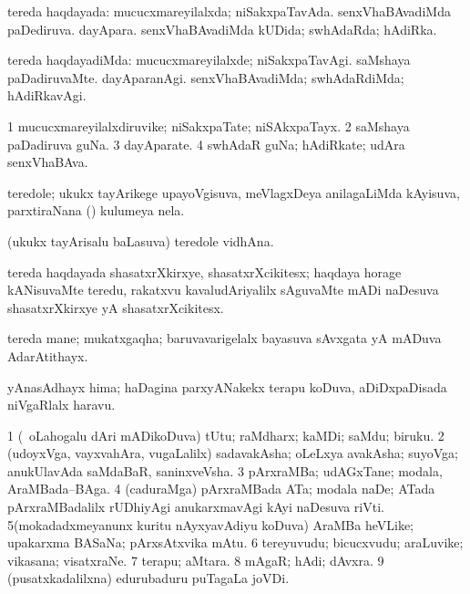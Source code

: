 \bentry
{}
\gl{\gu}
\bmng
tereda haqdayada: 
\banum
{} mucucxmareyilalxda; niSakxpaTavAda. 
 senxVhaBAvadiMda paDediruva. 
 dayApara. 
 senxVhaBAvadiMda kUDida; swhAdaRda; hAdiRka. 
\eanum
\emng
\eentry

\bentry
{}
\gl{\kirxvi}
\bmng
tereda haqdayadiMda: 
\banum
{} mucucxmareyilalxde; niSakxpaTavAgi. 
 saMshaya paDadiruvaMte. 
 dayAparanAgi. 
 senxVhaBAvadiMda; swhAdaRdiMda; hAdiRkavAgi. 
\eanum
\emng
\eentry

\bentry
{}
\gl{\nA}
\bmng
\bnum
\num{1} mucucxmareyilalxdiruvike; niSakxpaTate; niSAkxpaTayx. 
\num{2} saMshaya paDadiruva guNa. 
\num{3} dayAparate. 
\num{4} swhAdaR guNa; hAdiRkate; udAra senxVhaBAva. 
\enum
\emng
\eentry

\bentry
{}
\gl{\nA}
\bmng
teredole; ukukx tayArikege upayoVgisuva, meVlagxDeya anilagaLiMda kAyisuva, parxtiraNana () kulumeya nela. 
\emng
\eentry

\bentry
{}
\gl{\nA}
\bmng
(ukukx tayArisalu baLasuva) teredole vidhAna. 
\emng
\eentry

\bentry
{}
\gl{\nA}
\bmng
tereda haqdayada shasatxrXkirxye, shasatxrXcikitesx; haqdaya horage kANisuvaMte teredu, rakatxvu kavaludAriyalilx sAguvaMte mADi naDesuva shasatxrXkirxye yA shasatxrXcikitesx. 
\emng
\eentry

\bentry
{}
\gl{\nA}
\bmng
tereda mane; mukatxgaqha; baruvavarigelalx bayasuva sAvxgata yA mADuva AdarAtithayx. 
\emng
\eentry

\bentry
{}
\gl{\nA}
\bmng
yAnasAdhayx hima; haDagina parxyANakekx terapu koDuva, aDiDxpaDisada niVgaRlalx haravu. 
\emng
\eentry

\bentry
{}
\gl{\nA}
\bmng
\bnum
\num{1} (\kanmu\ oLahogalu dAri mADikoDuva) tUtu; raMdharx; kaMDi; saMdu; biruku. 
\num{2} (udoyxVga, vayxvahAra, \mo vugaLalilx) sadavakAsha; oLeLxya avakAsha; suyoVga; anukUlavAda saMdaBaR, saninxveVsha. 
\num{3} pArxraMBa; udAGxTane; modala, AraMBada--BAga. 
\num{4} (caduraMga) pArxraMBada ATa; modala naDe; ATada pArxraMBadalilx rUDhiyAgi anukarxmavAgi kAyi naDesuva riVti. 
\num{5}(mokadadxmeyanunx kuritu nAyxyavAdiyu koDuva) AraMBa heVLike; upakarxma BASaNa; pArxsAtxvika mAtu. 
\num{6} tereyuvudu; bicucxvudu; araLuvike; vikasana; visatxraNe. 
\num{7} terapu; aMtara. 
\num{8} mAgaR; hAdi; dAvxra. 
\num{9} (pusatxkadalilxna) edurubaduru puTagaLa joVDi. 
\enum
\emng
\eentry

